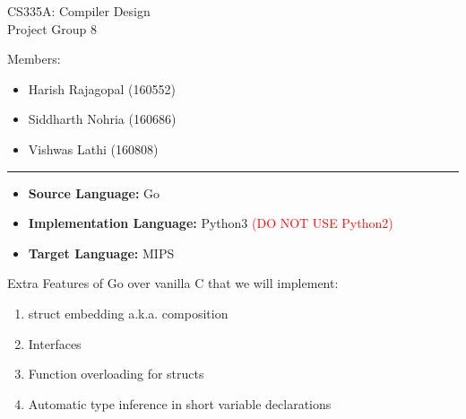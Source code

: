 \documentclass{article}
\begin{document}
    \begin{center}
        \Large
        CS335A: Compiler Design\\
        Project Group 8
        \vspace{1cm}

        Members:
        \begin{itemize}[leftmargin=3cm]
            \item Harish Rajagopal (160552)
            \item Siddharth Nohria (160686)
            \item Vishwas Lathi (160808)
        \end{itemize}
    \end{center}
    \hrule
    \vspace{1.5cm}

    \large
    \begin{itemize}
        \item \textbf{Source Language:} Go
        \item \textbf{Implementation Language:} Python3 \textcolor{red}{(DO NOT USE Python2)}
        \item \textbf{Target Language:} MIPS
    \end{itemize}
    \vspace{7.5mm}

    Extra Features of Go over vanilla C that we will implement:
    \begin{enumerate}
        \item struct embedding a.k.a. composition
        \item Interfaces
        \item Function overloading for structs
        \item Automatic type inference in short variable declarations
    \end{enumerate}
\end{document}
